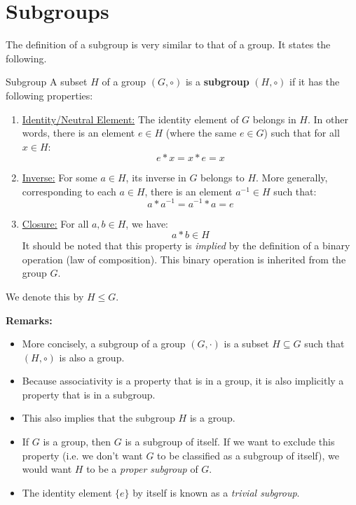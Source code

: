 \documentclass[letterpaper]{article}
\begin{document}
\newpage 
\section{Subgroups}
The definition of a subgroup is very similar to that of a group. It states the following. 
\begin{definition}{Subgroup}{}
    A subset $H$ of a group $(G, \circ)$ is a \textbf{subgroup} $(H, \circ)$ if it has the following properties: 
    \begin{enumerate}
        \item \underline{Identity/Neutral Element:} The identity element of $G$ belongs in $H$. In other words, there is an element $e \in H$ (where the same $e \in G$) such that for all $x \in H$:
        \[e * x = x * e = x\]

        \item \underline{Inverse:} For some $a \in H$, its inverse in $G$ belongs to $H$. More generally, corresponding to each $a \in H$, there is an element $a^{-1} \in H$ such that:
        \[a * a^{-1} = a^{-1} * a = e\]

        \item \underline{Closure:} For all $a, b \in H$, we have:
        \[a * b \in H\]
        It should be noted that this property is \emph{implied} by the definition of a binary operation (law of composition). This binary operation is inherited from the group $G$.  
    \end{enumerate}
    We denote this by $H \leq G$. 
\end{definition}
\textbf{Remarks:}
\begin{itemize}
    \item More concisely, a subgroup of a group $(G, \cdot)$ is a subset $H \subseteq G$ such that $(H, \circ)$ is also a group.
    \item Because associativity is a property that is in a group, it is also implicitly a property that is in a subgroup. 
    \item This also implies that the subgroup $H$ is a group.
    \item If $G$ is a group, then $G$ is a subgroup of itself. If we want to exclude this property (i.e. we don't want $G$ to be classified as a subgroup of itself), we would want $H$ to be a \emph{proper subgroup} of $G$.
    \item The identity element $\{e\}$ by itself is known as a \emph{trivial subgroup}. 
\end{itemize}
\end{document}
